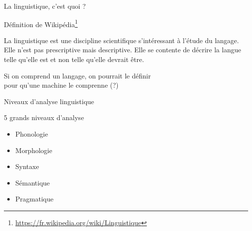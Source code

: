 \documentclass[serif, aspectratio=169]{beamer}
\begin{document}
\begin{frame}{La linguistique, c'est quoi ?}
    \begin{block}{Définition de Wikipédia\footnote{\url{https://fr.wikipedia.org/wiki/Linguistique}}}
        \begin{tcolorbox}
            La linguistique est une discipline scientifique s'intéressant à l'étude du langage. Elle n'est pas prescriptive mais descriptive. Elle se contente de décrire la langue telle qu'elle est et non telle qu'elle devrait être.
        \end{tcolorbox}
    \end{block}
    \pause
    \begin{center}
        \Large 
        Si on comprend un langage, on pourrait le définir \\ 
        pour qu'une machine le comprenne (?)
    \end{center}
\end{frame}

\begin{frame}{Niveaux d'analyse linguistique}
    \begin{block}{5 grands niveaux d'analyse}
        \pause
        \begin{itemize}
            \item Phonologie
            \item Morphologie
            \item Syntaxe
            \item Sémantique
            \item Pragmatique
        \end{itemize}
    \end{block}
\end{frame}
\end{document}
